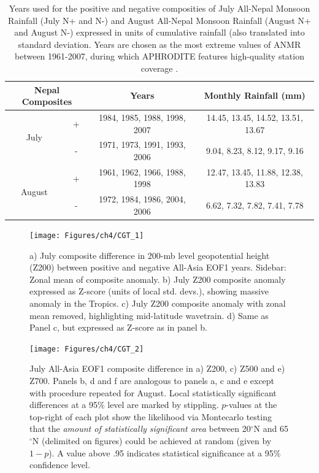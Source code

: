 \begin{table}[p]

\caption{Years used for the positive and negative composities of July All-Nepal Monsoon Rainfall (July N+ and N-) and August All-Nepal Monsoon Rainfall (August N+ and August N-) expressed in units of cumulative rainfall (also translated into standard deviation. Years are chosen as the most extreme values of ANMR between 1961-2007, during which APHRODITE features high-quality station coverage \citep{Day2015}.}
\centering

\begin{tabular}{ c c c c}
	 	 		\multicolumn{2}{c}{Nepal Composites} 	&			Years				&			Monthly Rainfall (mm)		\tabularnewline	
				\hline
	 \multirow{2}{*}{July} 		&  +						&	1984, 1985, 1988, 1998, 2007 	&	14.45, 13.45, 14.52, 13.51, 13.67		\tabularnewline
	 						&  -						&	1971, 1973, 1991, 1993, 2006       &	9.04, 8.23, 8.12, 9.17, 9.16 			\tabularnewline
	 \multirow{2}{*}{August}	&  + 						&	1961, 1962, 1966, 1988, 1998	&	12.47, 13.45, 11.88, 12.38, 13.83		\tabularnewline
	 						&  -  						&	1972, 1984, 1986, 2004, 2006	&	6.62, 7.32, 7.82, 7.41, 7.78			\tabularnewline

\end{tabular}
\label{tab:t41}
\end{table}

\newpage
\clearpage



\begin{figure}
\centering
\noindent\texttt{[image: Figures/ch4/CGT\_1]}
\caption{a) July composite difference in 200-mb level geopotential height (Z200) between positive and negative All-Asia EOF1 years. Sidebar: Zonal mean of composite anomaly. b) July Z200 composite anomaly expressed as Z-score (units of local std. devs.), showing massive anomaly in the Tropics. c) July Z200 composite anomaly with zonal mean removed, highlighting mid-latitude wavetrain. d) Same as Panel c, but expressed as Z-score as in panel b.}
\label{fig:cgt_zonal}
\end{figure}

\begin{figure}
\centering
\noindent\texttt{[image: Figures/ch4/CGT\_2]}
\caption{July All-Asia EOF1 composite difference in a) Z200, c) Z500 and e) Z700. Panels b, d and f are analogous to panels a, c and e except with procedure repeated for August. Local statistically significant differences at a 95\% level are marked by stippling. $p$-values at the top-right of each plot show the likelihood via Montecarlo testing that the \textit{amount of statistically significant area} between 20$^{\circ}$N and 65$^{\circ}$N (delimited on figures) could be achieved at random (given by $1-p$). A value above .95 indicates statistical significance at a 95\% confidence level.}
\label{fig:cgt_z}
\end{figure}


